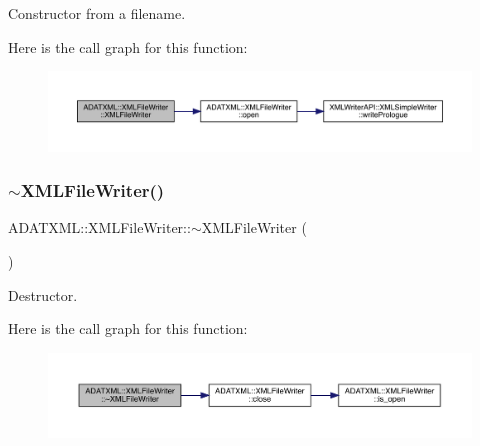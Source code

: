 Constructor from a filename. 

Here is the call graph for this function\+:
\nopagebreak
\begin{figure}[H]
\begin{center}
\leavevmode
\includegraphics[width=350pt]{d6/ddb/classADATXML_1_1XMLFileWriter_a83cf749ff969a30d3de1895f271b238a_cgraph}
\end{center}
\end{figure}
\mbox{\label{classADATXML_1_1XMLFileWriter_af3d1109d92631884682eac46624ca7fd}} 
\subsubsection{\texorpdfstring{$\sim$XMLFileWriter()}{~XMLFileWriter()}\hspace{0.1cm}{\footnotesize\ttfamily [1/2]}}
{\footnotesize\ttfamily A\+D\+A\+T\+X\+M\+L\+::\+X\+M\+L\+File\+Writer\+::$\sim$\+X\+M\+L\+File\+Writer (\begin{DoxyParamCaption}{ }\end{DoxyParamCaption})}



Destructor. 

Here is the call graph for this function\+:\nopagebreak
\begin{figure}[H]
\begin{center}
\leavevmode
\includegraphics[width=350pt]{d6/ddb/classADATXML_1_1XMLFileWriter_af3d1109d92631884682eac46624ca7fd_cgraph}
\end{center}
\end{figure}
\mbox{\label{classADATXML_1_1XMLFileWriter_a40db177b66a4598583a3a08e19c1e927}} 
